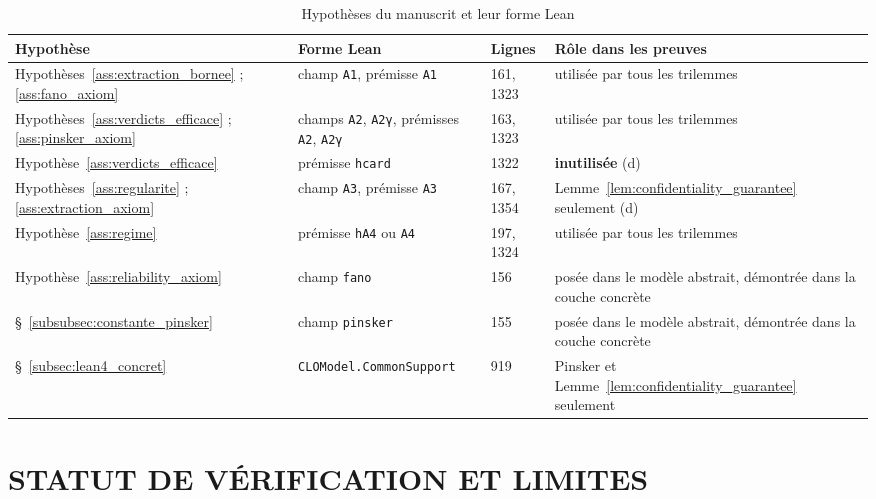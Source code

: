{\footnotesize
\begin{longtable}{@{}p{3cm}p{4.6cm}p{1.6cm}p{5.1cm}@{}}
\caption{Hypoth\`eses du manuscrit et leur forme Lean}\label{tab:lean4_hypotheses}\\
\toprule
\textbf{Hypoth\`ese} & \textbf{Forme Lean} & \textbf{Lignes} & \textbf{R\^ole dans les preuves} \\
\midrule
\endfirsthead
\bottomrule
\endfoot
Hypothèses~\ref{ass:extraction_bornee} ; \ref{ass:fano_axiom} & champ \texttt{A1}, prémisse \texttt{A1} & 161, 1323 & utilisée par tous les trilemmes \\
Hypothèses~\ref{ass:verdicts_efficace} ; \ref{ass:pinsker_axiom} & champs \texttt{A2}, \texttt{A2γ}, prémisses \texttt{A2}, \texttt{A2γ} & 163, 1323 & utilisée par tous les trilemmes \\
Hypothèse~\ref{ass:verdicts_efficace} & prémisse \texttt{hcard} & 1322 & \textbf{inutilisée} (d) \\
Hypothèses~\ref{ass:regularite} ; \ref{ass:extraction_axiom} & champ \texttt{A3}, prémisse \texttt{A3} & 167, 1354 & Lemme~\ref{lem:confidentiality_guarantee} seulement (d) \\
Hypothèse~\ref{ass:regime} & prémisse \texttt{hA4} ou \texttt{A4} & 197, 1324 & utilisée par tous les trilemmes \\
Hypothèse~\ref{ass:reliability_axiom} & champ \texttt{fano} & 156 & posée dans le modèle abstrait, démontrée dans la couche concrète \\
§~\ref{subsubsec:constante_pinsker} & champ \texttt{pinsker} & 155 & posée dans le modèle abstrait, démontrée dans la couche concrète \\
§~\ref{subsec:lean4_concret} & \texttt{CLOModel.CommonSupport} & 919 & Pinsker et Lemme~\ref{lem:confidentiality_guarantee} seulement \\
\end{longtable}
}

\section{STATUT DE V\'ERIFICATION ET LIMITES}
\label{sec:lean4_statut}

